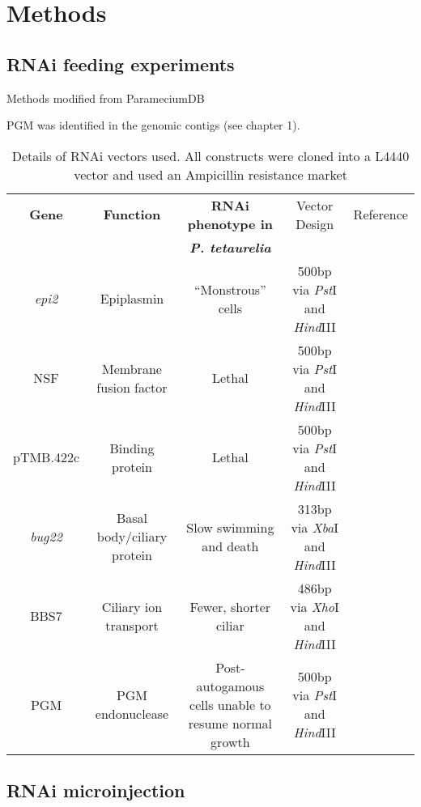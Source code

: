 \section{Methods}

\subsection{RNAi feeding experiments}

Methods modified from ParameciumDB 

PGM was identified in the genomic contigs (see chapter 1).

\begin{table}
    \begin{tabular}{|c|c|c|c|c|}
        \hline
    \textbf{Gene} & \textbf{Function} & \textbf{RNAi phenotype in}      & Vector Design & Reference \\
                  &                   & \textbf{\textit{P. tetaurelia}} &               &           \\
        \hline
        \textit{epi2} & Epiplasmin & ``Monstrous'' cells  & 500bp via \textit{Pst}I and \textit{Hind}III & \citep{Damaj2009} \\
        NSF & Membrane fusion factor & Lethal & 500bp via \textit{Pst}I and \textit{Hind}III & \citep{Galvani2002} \\
        pTMB.422c & Binding protein & Lethal & 500bp via \textit{Pst}I and \textit{Hind}III & \citep{Nowack2011} \\
        \textit{bug22} & Basal body/ciliary protein & Slow swimming and death & 313bp via \textit{Xba}I and \textit{Hind}III & \citep{Laligne2010} \\
        BBS7 & Ciliary ion transport & Fewer, shorter ciliar & 486bp via \textit{Xho}I and \textit{Hind}III & \citep{Valentine2012} \\
        PGM & PGM endonuclease & Post-autogamous cells unable to resume normal growth & 500bp via \textit{Pst}I and \textit{Hind}III & \citep{Baudry2009} \\
        \hline
    \end{tabular}
    \caption{Details of RNAi vectors used.  All constructs were cloned into a L4440 vector and used an Ampicillin resistance market}
    \label{tab:rnai_vecs}
\end{table}


\subsection{RNAi microinjection}

